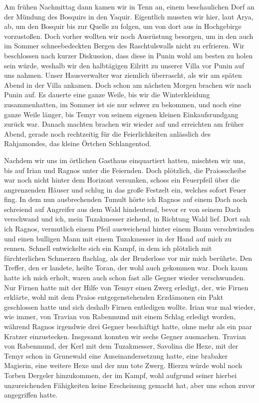 Am frühen Nachmittag dann kamen wir in Tenn an, einem beschaulichen Dorf an der Mündung des Bosquirs in den Yaquir. Eigentlich mussten wir hier, laut Arya, ab, um den Bosquir bis zur Quelle zu folgen, um von dort aus in Hochgebirge vorzustoßen. Doch vorher wollten wir noch Ausrüstung besorgen, um in den auch im Sommer schneebedeckten Bergen des Raschtulswalls nicht zu erfrieren. Wir beschlossen nach kurzer Diskussion, dass diese in Punin wohl am besten zu holen sein würde, weshalb wir den halbtägigen Eilritt zu unserer Villa vor Punin auf uns nahmen. Unser Hausverwalter war ziemlich überrascht, als wir am späten Abend in der Villa ankamen. Doch schon am nächsten Morgen brachen wir nach Punin auf. Es dauerte eine ganze Weile, bis wir die Winterkleidung zusammenhatten, im Sommer ist sie nur schwer zu bekommen, und noch eine ganze Weile länger, bis Temyr von seinem eigenen kleinen Einkaufsrundgang zurück war. Danach machten brachen wir wieder auf und erreichten am früher Abend, gerade noch rechtzeitig für die Feierlichkeiten anlässlich des Rahjamondes, das kleine Örtchen Schlangentod. 

Nachdem wir uns im örtlichen Gasthaus einquartiert hatten, mischten wir uns, bis auf Irian und Ragnos unter die Feiernden. Doch plötzlich, die Praiosscheibe war noch nicht hinter dem Horizont versunken, schoss ein Feuerpfeil über die angrenzenden Häuser und schlug in das große Festzelt ein, welches sofort Feuer fing. In dem nun ausbrechenden Tumult hörte ich Ragnos auf einem Dach noch schreiend auf Angreifer aus dem Wald hindeutend, bevor er von seinem Dach verschwand und ich, mein Tuzakmesser ziehend, in Richtung Wald lief. Dort sah ich Ragnos, vermutlich einem Pfeil ausweichend hinter einem Baum verschwinden und einen bulligen Mann mit einem Tuzakmesser in der Hand auf mich zu rennen. Schnell entwickelte sich ein Kampf, in dem ich plötzlich mit fürchterlichen Schmerzen flachlag, als der Bruderlose vor mir mich berührte. Den Treffer, den er landete, heilte Toran, der wohl auch gekommen war. Doch kaum hatte ich mich erholt, waren auch schon fast alle Gegner wieder verschwunden. Nur Firnen hatte mit der Hilfe von Temyr einen Zwerg erledigt, der, wie Firnen erklärte, wohl mit dem Praios entgegenstehenden Erzdämonen ein Pakt geschlossen hatte und sich deshalb Firnen entledigen wollte. Irian war mal wieder, wie immer, von Travian von Rabenmund mit einem Schlag erledigt worden, während Ragnos irgendwie drei Gegner beschäftigt hatte, ohne mehr als ein paar Kratzer einzustecken. Insgesamt konnten wir sechs Gegner ausmachen. Travian von Rabenmund, der Kerl mit dem Tuzakmesser, Savolina die Hexe, mit der Temyr schon in Grunewald eine Auseinandersetzung hatte, eine brabaker Magierin, eine weitere Hexe und der nun tote Zwerg. Hierzu würde wohl noch Torben Dergeler hinzukommen, der im Kampf, wohl aufgrund seiner hierbei unzureichenden Fähigkeiten keine Erscheinung gemacht hat, aber uns schon zuvor angegriffen hatte.


